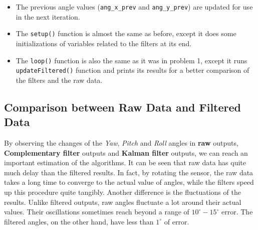 \documentclass[conference]{IEEEtran}
\let\oldtexttt\texttt
\renewcommand{\texttt}[1]{\small\oldtexttt{#1}}
\begin{document}
\begin{itemize}
    \item The previous angle values (\texttt{ang\_x\_prev} and \texttt{ang\_y\_prev}) are updated for use in the next iteration.
    \item The \texttt{setup()} function is almost the same as before, except it does some initializations of variables related to the filters at its end.
    \item The \texttt{loop()} function is also the same as it was in problem 1, except it runs \texttt{updateFiltered()} function and prints its results for a better comparison of the filters and the raw data.
\end{itemize}


\subsection{Comparison between Raw Data and Filtered Data}
By observing the changes of the \textit{Yaw}, \textit{Pitch} and \textit{Roll} angles in \textbf{raw} outputs, \textbf{Complementary filter} outputs and \textbf{Kalman filter} outputs, we can reach an important estimation of the algorithms. It can be seen that raw data has quite much delay than the filtered results. In fact, by rotating the sensor, the raw data takes a long time to converge to the actual value of angles, while the filters speed up this procedure quite tangibly. Another difference is the fluctuations of the results. Unlike filtered outputs, raw angles fluctuate a lot around their actual values. Their oscillations sometimes reach beyond a range of \(10^\circ-15^\circ\) error. The filtered angles, on the other hand, have less than \(1^\circ\) of error.
\end{document}
